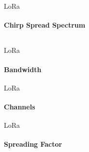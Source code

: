 \begin{frame}{LoRa}
\framesubtitle{Chirp Spread Spectrum}
\begin{columns}
  \begin{column}{0.5\textwidth}
    
  \end{column}
  \begin{column}{0.5\textwidth}
    \begin{center}
    \end{center}
  \end{column}
\end{columns}

\end{frame}

\begin{frame}{LoRa}
\framesubtitle{Bandwidth}
\end{frame}

\begin{frame}{LoRa}
\framesubtitle{Channels}
\end{frame}

\begin{frame}{LoRa}
\framesubtitle{Spreading Factor}

\end{frame}
